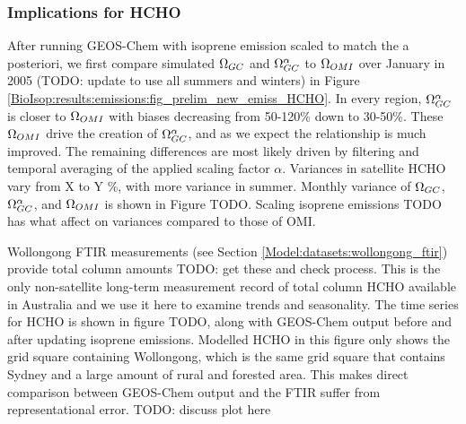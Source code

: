     
    

    \subsubsection{Implications for HCHO}
  
      After running GEOS-Chem with isoprene emission scaled to match the a posteriori, we first compare simulated $\Omega_{GC}$ and $\Omega_{GC}^{\alpha}$ to $\Omega_{OMI}$ over January in 2005 (TODO: update to use all summers and winters) in Figure \ref{BioIsop:results:emissions:fig_prelim_new_emiss_HCHO}.
      In every region, $\Omega_{GC}^{\alpha}$ is closer to $\Omega_{OMI}$ with biases decreasing from 50-120\% down to 30-50\%.
      These $\Omega_{OMI}$ drive the creation of $\Omega_{GC}^{\alpha}$, and as we expect the relationship is much improved.
      The remaining differences are most likely driven by filtering and temporal averaging of the applied scaling factor $\alpha$.
      Variances in satellite HCHO vary from X to Y \%, with more variance in summer.
      Monthly variance of $\Omega_{GC}$, $\Omega_{GC}^{\alpha}$, and $\Omega_{OMI}$ is shown in Figure TODO.
      Scaling isoprene emissions TODO has what affect on variances compared to those of OMI.
      
      
      
      
      Wollongong FTIR measurements (see Section \ref{Model:datasets:wollongong_ftir}) provide total column amounts TODO: get these and check process.
      This is the only non-satellite long-term measurement record of total column HCHO available in Australia and we use it here to examine trends and seasonality.
      The time series for HCHO is shown in figure TODO, along with GEOS-Chem output before and after updating isoprene emissions.
      Modelled HCHO in this figure only shows the grid square containing Wollongong, which is the same grid square that contains Sydney and a large amount of rural and forested area.
      This makes direct comparison between GEOS-Chem output and the FTIR suffer from representational error.
      TODO: discuss plot here
      
